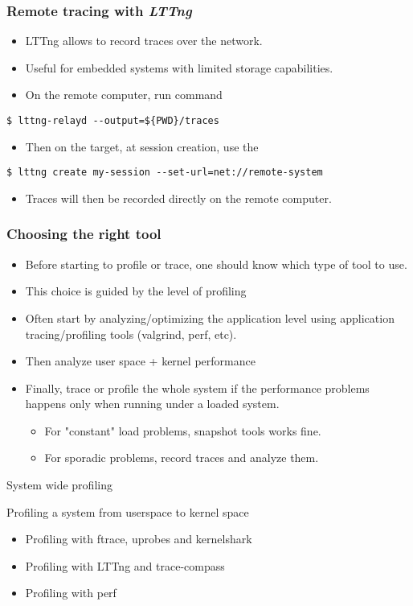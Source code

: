\begin{frame}[fragile]
  \frametitle{Remote tracing with {\em LTTng}}
  \begin{itemize}
    \item LTTng allows to record traces over the network.
    \item Useful for embedded systems with limited storage capabilities.
    \item On the remote computer, run  command
  \end{itemize}
  \begin{block}{}
    \begin{verbatim}
$ lttng-relayd --output=${PWD}/traces
   \end{verbatim}
  \end{block}
  \begin{itemize}
    \item Then on the target, at session creation, use the 
  \end{itemize}
  \begin{block}{}
    \begin{verbatim}
$ lttng create my-session --set-url=net://remote-system
   \end{verbatim}
  \end{block}
  \begin{itemize}
    \item Traces will then be recorded directly on the remote computer.
  \end{itemize}
\end{frame}

\begin{frame}[fragile]
  \frametitle{Choosing the right tool}
  \begin{itemize}
    \item Before starting to profile or trace, one should know which type of
          tool to use.
    \item This choice is guided by the level of profiling
    \item Often start by analyzing/optimizing the application level using
          application tracing/profiling tools (valgrind, perf, etc).
    \item Then analyze user space + kernel performance
    \item Finally, trace or profile the whole system if the performance problems
          happens only when running under a loaded system.
    \begin{itemize}
      \item For "constant" load problems, snapshot tools works fine.
      \item For sporadic problems, record traces and analyze them.
    \end{itemize}
  \end{itemize}
\end{frame}

\setuplabframe
{System wide profiling}
{
  Profiling a system from userspace to kernel space
  \begin{itemize}
    \item Profiling with ftrace, uprobes and kernelshark
    \item Profiling with LTTng and trace-compass
    \item Profiling with perf
  \end{itemize}
}
